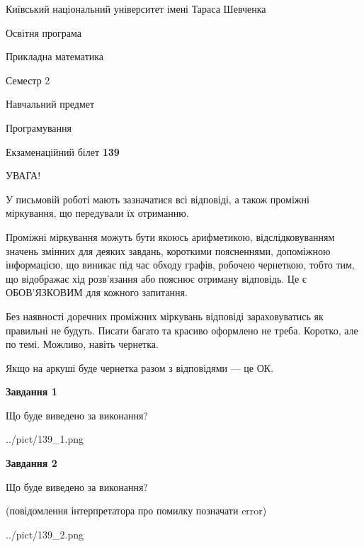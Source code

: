 \documentclass[12pt, ukrainian]{article}
\begin{document}
{{\begin {small}\par
{ \center  Київський національний університет імені Тараса Шевченка \par}
{\parbox {5 cm}{Освітня програма \hfill}{\parbox {7 cm}{Прикладна математика\hfill}}\parbox {6 cm}{\hfill Семестр 2}}\par
{\parbox {5 cm} {Навчальний предмет \hfill}\parbox {7 cm}{Програмування \hfill}\parbox {6cm}{\hfill}\par}\vspace{-7pt} \end{small}}{\center Екзаменаційний білет \No \textbf
{ 139 }\par}}
{
\begin {large}
УВАГА!

У письмовій роботі мають зазначатися всі відповіді, а також проміжні міркування, що передували їх отриманню.

Проміжні міркування можуть бути якоюсь арифметикою, відслідковуванням зна\-чень змінних для деяких завдань,
короткими поясненнями, допоміжною інформацією, що виникає під час обходу графів, робочею чернеткою,
тобто тим, що відображає хід розв’язання або пояснює отриману відповідь.
Це є ОБОВ’ЯЗКОВИМ для кожного запитання.

Без наявності доречних проміжних міркувань відповіді зараховуватись як правиль\-ні не будуть.
Писати багато та красиво оформлено не треба. Коротко, але по темі. Можли\-во, навіть чернетка.

Якщо на аркуші буде чернетка разом з відповідями --- це ОК.

\newpage

{\begin {center}\textbf{Завдання 1}\end {center}}\par
Що буде виведено за виконання?\par
\begin{center}
	{../pict/139_1.png}
\end{center}
\newpage

{\begin {center}\textbf{Завдання 2}\end {center}}\par
Що буде виведено за виконання?\par
 (повідомлення інтерпретатора про помилку позначати error)\par
\begin{center}
	{../pict/139_2.png}
\end{center}
\newpage


\end{large}}
\end{document}

